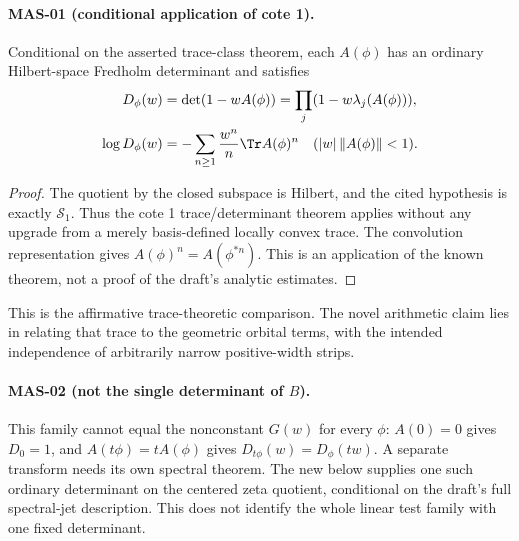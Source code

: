 \paragraph{MAS-01 (conditional application of cote 1).}
Conditional on the asserted trace-class theorem, each $A(\phi)$ has an ordinary Hilbert-space Fredholm determinant and satisfies
\begin{align*}
 D_\phi(w)&=\det(1-wA(\phi))=\prod_j(1-w\lambda_j(A(\phi))),\\
 \log D_\phi(w)&=-\sum_{n\ge1}\frac{w^n}{n}\Tr A(\phi)^n
 \quad (|w|\,\|A(\phi)\|<1).
\end{align*}
\begin{proof}
The quotient by the closed subspace is Hilbert, and the cited hypothesis is exactly $\mathcal S_1$. Thus the cote 1 trace/determinant theorem applies without any upgrade from a merely basis-defined locally convex trace. The convolution representation gives $A(\phi)^n=A(\phi^{*n})$. This is an application of the known theorem, not a proof of the draft's analytic estimates.
\end{proof}
This is the affirmative trace-theoretic comparison. The novel arithmetic claim lies in relating that trace to the geometric orbital terms, with the intended independence of arbitrarily narrow positive-width strips.

\paragraph{MAS-02 (not the single determinant of $B$).}
This family cannot equal the nonconstant $G(w)$ for every $\phi$: $A(0)=0$ gives $D_0=1$, and $A(t\phi)=tA(\phi)$ gives $D_{t\phi}(w)=D_\phi(tw)$. A separate transform needs its own spectral theorem. The new  below supplies one such ordinary determinant on the centered zeta quotient, conditional on the draft's full spectral-jet description. This does not identify the whole linear test family with one fixed determinant.

